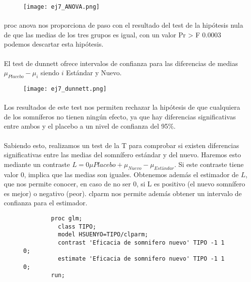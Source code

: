 \documentclass{article}
\begin{document}
    \begin{figure}[H]
      \centering
      \texttt{[image: ej7\_ANOVA.png]}
    \end{figure}

    \paragraph{}
    proc anova nos proporciona de paso con el resultado del test de la hipótesis nula de que las medias de los tres grupos es igual, con un valor Pr > F 0.0003 podemos descartar esta hipótesis.

    \paragraph{}
    El test de dunnett ofrece intervalos de confianza para las diferencias de medias $\mu_{Placebo} - \mu_{i}$ siendo $i$ Estándar y Nuevo.

    \begin{figure}[H]
      \centering
      \texttt{[image: ej7\_dunnett.png]}
    \end{figure}

    \paragraph{}
    Los resultados de este test nos permiten rechazar la hipótesis de que cualquiera de los somníferos no tienen ningún efecto, ya que hay diferencias significativas entre ambos y el placebo a un nivel de confianza del 95\%.

    \paragraph{}
    Sabiendo esto, realizamos un test de la T para comprobar si existen diferencias significativas entre las medias del somnífero estándar y del nuevo. Haremos esto mediante un contraste $L=0\mu{Placebo} + \mu_{Nuevo} - \mu_{Estándar}$. Si este contraste tiene valor 0, implica que las medias son iguales. Obtenemos además el estimador de $L$, que nos permite conocer, en caso de no ser 0, si L es positivo (el nuevo somnífero es mejor) o negativo (peor). clparm nos permite además obtener un intervalo de confianza para el estimador.

    \begin{figure}[h]
      \centering
      \begin{verbatim}
        proc glm;
          class TIPO;
          model HSUENYO=TIPO/clparm;
          contrast 'Eficacia de somnifero nuevo' TIPO -1 1 0;
          estimate 'Eficacia de somnifero nuevo' TIPO -1 1 0;
        run;
      \end{verbatim}
      \label{code:sas_2}
    \end{figure}
\end{document}
